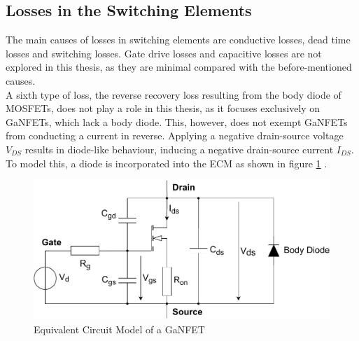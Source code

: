 \subsection{Losses in the Switching Elements}\label{sec:losses_in_switching_elements}
The main causes of losses in switching elements are conductive losses, dead time losses and switching losses. Gate drive losses and capacitive losses are not explored in this thesis, as they are minimal compared with the before-mentioned causes. \\
A sixth type of loss, the reverse recovery loss resulting from the body diode of \acp{MOSFET}, does not play a role in this thesis, as it focuses exclusively on \acp{GaNFET}, which lack a body diode. This, however, does not exempt \acp{GaNFET} from conducting a current in reverse. Applying a negative drain-source voltage $V_{DS}$ results in diode-like behaviour, inducing a negative drain-source current $I_{DS}$. To model this, a diode is incorporated into the \ac{ECM} as shown in figure \ref{fig:GaNFET_ECM} \cite{Does_GaN_Have_a_Body_Diode}.
\begin{figure}[H]
    \centering
    \includegraphics[width=0.8\linewidth]{Bilder//Kapitel2/GaNFET_ECM.pdf}
    \caption{Equivalent Circuit Model of a GaNFET}
    \label{fig:GaNFET_ECM}
\end{figure}
